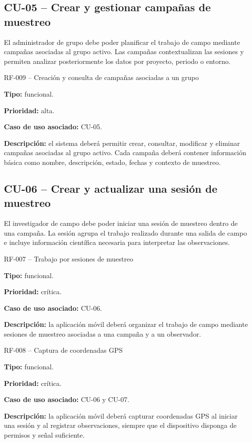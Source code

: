 \subsection{CU-05 -- Crear y gestionar campañas de muestreo}

El administrador de grupo debe poder planificar el trabajo de campo mediante
campañas asociadas al grupo activo. Las campañas contextualizan las sesiones y
permiten analizar posteriormente los datos por proyecto, periodo o entorno.

\begin{requisitocard}{RF-009 -- Creación y consulta de campañas asociadas a un grupo}

\textbf{Tipo:} funcional.

\textbf{Prioridad:} alta.

\textbf{Caso de uso asociado:} CU-05.

\textbf{Descripción:} el sistema deberá permitir crear, consultar, modificar y
eliminar campañas asociadas al grupo activo. Cada campaña deberá contener
información básica como nombre, descripción, estado, fechas y contexto de
muestreo.

\end{requisitocard}

\subsection{CU-06 -- Crear y actualizar una sesión de muestreo}

El investigador de campo debe poder iniciar una sesión de muestreo dentro de una
campaña. La sesión agrupa el trabajo realizado durante una salida de campo e
incluye información científica necesaria para interpretar las observaciones.

\begin{requisitocard}{RF-007 -- Trabajo por sesiones de muestreo}

\textbf{Tipo:} funcional.

\textbf{Prioridad:} crítica.

\textbf{Caso de uso asociado:} CU-06.

\textbf{Descripción:} la aplicación móvil deberá organizar el trabajo de campo
mediante sesiones de muestreo asociadas a una campaña y a un observador.

\end{requisitocard}

\begin{requisitocard}{RF-008 -- Captura de coordenadas GPS}

\textbf{Tipo:} funcional.

\textbf{Prioridad:} crítica.

\textbf{Caso de uso asociado:} CU-06 y CU-07.

\textbf{Descripción:} la aplicación móvil deberá capturar coordenadas GPS al
iniciar una sesión y al registrar observaciones, siempre que el dispositivo
disponga de permisos y señal suficiente.

\end{requisitocard}

